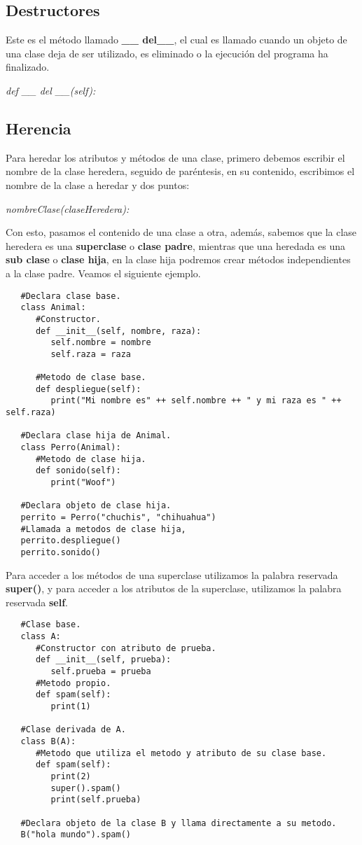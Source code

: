 \subsection{Destructores}
\hspace{0.55cm}Este es el método llamado \textbf{\_\_ del\_\_}, el cual es llamado cuando un objeto de una clase deja de ser utilizado, es eliminado o la ejecución del programa ha finalizado.
\begin{center}
	\textit{def \_\_ del \_\_(self):}
\end{center}


\subsection{Herencia}
\hspace{0.55cm}Para heredar los atributos y métodos de una clase, primero debemos escribir el nombre de la clase heredera, seguido de paréntesis, en su contenido, escribimos el nombre de la clase a heredar y dos puntos:
\begin{center}
   \textit{nombreClase(claseHeredera):}
\end{center}

Con esto, pasamos el contenido de una clase a otra, además, sabemos que la clase heredera es una \textbf{superclase} o \textbf{clase padre}, mientras que una heredada es una \textbf{sub clase} o \textbf{clase hija}, en la clase hija podremos crear métodos independientes a la clase padre. Veamos el siguiente ejemplo.
\begin{lstlisting}
   #Declara clase base.
   class Animal:
      #Constructor.
      def __init__(self, nombre, raza):
         self.nombre = nombre
         self.raza = raza
      
      #Metodo de clase base.
      def despliegue(self):
         print("Mi nombre es" ++ self.nombre ++ " y mi raza es " ++ self.raza)
   
   #Declara clase hija de Animal.
   class Perro(Animal):
      #Metodo de clase hija.
      def sonido(self):
         print("Woof")
         
   #Declara objeto de clase hija.
   perrito = Perro("chuchis", "chihuahua")
   #Llamada a metodos de clase hija,
   perrito.despliegue()
   perrito.sonido()
\end{lstlisting}

Para acceder a los métodos de una superclase utilizamos la palabra reservada \textbf{super()}, y para acceder a los atributos de la superclase, utilizamos la palabra reservada \textbf{self}.
\begin{lstlisting}
   #Clase base.
   class A:
      #Constructor con atributo de prueba.
      def __init__(self, prueba):
         self.prueba = prueba
      #Metodo propio.
      def spam(self):
         print(1)

   #Clase derivada de A.
   class B(A):
      #Metodo que utiliza el metodo y atributo de su clase base.
      def spam(self):
         print(2)
         super().spam()
         print(self.prueba)

   #Declara objeto de la clase B y llama directamente a su metodo.
   B("hola mundo").spam()
\end{lstlisting}



